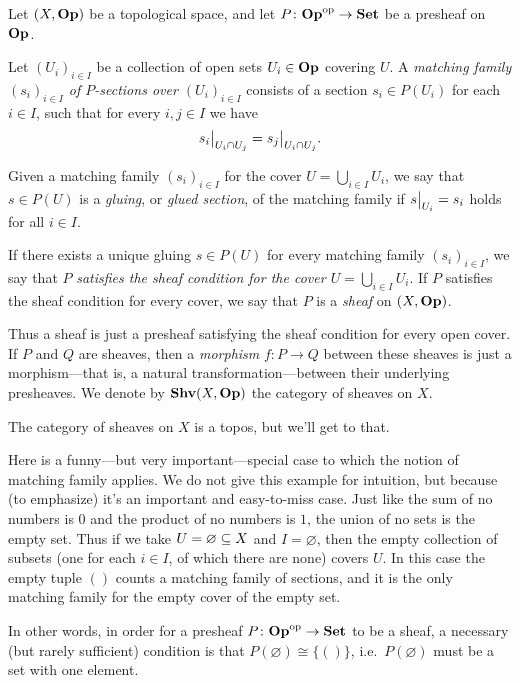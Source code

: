 \documentclass[7Sketches]{subfiles}
\begin{document}
\begin{definition}%
\label{def.sheaf}%
%
%
%
%
Let $(X,\Op)$ be a topological space, and let $P\colon\Op\op\to\smset$ be a presheaf on $\Op$. 

Let $(U_i)_{i\in I}$ be a collection of open sets $U_i\in\Op$ covering $U$. A \emph{matching family $(s_i)_{i\in I}$ of $P$-sections over $(U_i)_{i\in I}$} consists of a section $s_i\in P(U_i)$ for each $i\in I$, such that for every $i,j\in I$ we have 
\[
  \restrict{s_i}{U_i\cap U_j}=\restrict{s_j}{U_i\cap U_j}.
\]

Given a matching family $(s_i)_{i\in I}$ for the cover $U=\bigcup_{i\in I}U_i$,
we say that $s\in P(U)$ is a \emph{gluing}, or \emph{glued section}, of the
matching family if $\restrict{s}{U_i}=s_i$ holds for all $i\in I$.
  
If there exists a unique gluing $s\in P(U)$ for every matching family $(s_i)_{i\in I}$, we say that $P$ \emph{satisfies the sheaf condition for the cover $U=\bigcup_{i\in I}U_i$}. If $P$ satisfies the sheaf condition for every cover, we say that $P$ is a \emph{sheaf} on $(X,\Op)$.

Thus a sheaf is just a presheaf satisfying the sheaf condition for every open cover. If $P$ and $Q$
are sheaves, then a \emph{morphism} $f\colon P\to Q$ between these sheaves is just a morphism---that
is, a natural transformation---between their underlying presheaves. We denote by
$\Shv(X,\Op)$ the category of sheaves on $X$.%
\end{definition}

The category of sheaves on $X$ is a topos, but we'll get to that.%

\begin{example}%
\label{ex.empty_cover}%
Here is a funny---but very important---special case to which the notion of matching family applies. We do not give this example for intuition, but because (to emphasize) it's an important and easy-to-miss case. Just like the sum of no numbers is 0 and the product of no numbers is $1$, the union of no sets is the empty set. Thus if we take $U=\varnothing\ss X$ and $I=\varnothing$, then the empty collection of subsets (one for each $i\in I$, of which there are none) covers $U$. In this case the empty tuple $()$ counts a matching family of sections, and it is the only matching family for the empty cover of the empty set.

In other words, in order for a presheaf $P\colon\Op\op\to\smset$ to be a sheaf, a necessary (but rarely sufficient) condition is that $P(\varnothing)\cong\{()\}$, i.e.\ $P(\varnothing)$ must be a set with one element.
\end{example}
\end{document}
